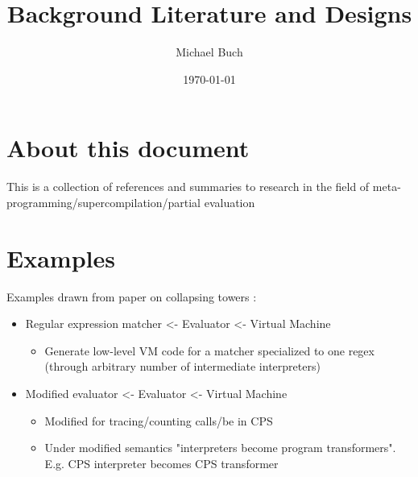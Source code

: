 \documentclass{article}
\title{Background Literature and Designs}
\author{Michael Buch}
\date{\today}
\begin{document}
\maketitle
\frenchspacing

\newcommand{\mslang}{$\lambda\uparrow\downarrow$}
\newcommand{\mslangStar}{$\lambda\uparrow\downarrow^*$}

\section{About this document}
This is a collection of references and summaries to research in the field of meta-programming/supercompilation/partial evaluation

\section{Examples}
Examples drawn from paper on collapsing towers \cite{amin2017collapsing}:
\begin{itemize}
	\item Regular expression matcher <- Evaluator <- Virtual Machine
	\begin{itemize}
		\item Generate low-level VM code for a matcher specialized to one regex (through arbitrary number of intermediate interpreters)
	\end{itemize}
	\item Modified evaluator <- Evaluator <- Virtual Machine
	\begin{itemize}
		\item Modified for tracing/counting calls/be in CPS
		\item Under modified semantics "interpreters become program transformers". E.g. CPS interpreter becomes CPS transformer
	\end{itemize}
\end{itemize}
\end{document}
